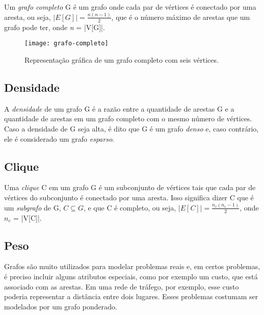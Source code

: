 Um \emph{grafo completo} G é um grafo onde cada par de vértices é conectado por uma aresta, ou seja, $|E[G]| = \frac{n(n-1)}{2}$, que é o número máximo de arestas que um grafo pode ter, onde \emph{n} = |V[G]|.

\begin{figure}[H]
\texttt{[image: grafo-completo]}
\centering
\caption{Representação gráfica de um grafo completo com seis vértices.}
\end{figure}

\subsection{Densidade}
\label{conceitos__grafo--densidade}

A \emph{densidade} de um grafo G é a razão entre a quantidade de arestas G e a quantidade de arestas em um grafo completo com o mesmo número de vértices. Caso a densidade de G seja alta, é dito que G é um grafo \emph{denso} e, caso contrário, ele é considerado um grafo \emph{esparso}.

\subsection{Clique}
\label{conceitos__grafo--clique}

Uma \emph{clique} C em um grafo G é um subconjunto de vértices tais que cada par de vértices do subconjunto é conectado por uma aresta. Isso significa dizer C que é um \emph{subgrafo} de G, $C \subseteq G$, e que C é completo, ou seja, $|E[C]| = \frac{n_{c}(n_{c}-1)}{2}$, onde $n_{c}$ = |V[C]|.


\subsection{Peso}
\label{conceitos__grafo--peso}

Grafos são muito utilizados para modelar problemas reais e, em certos problemas, é preciso incluir alguns atributos especiais, como por exemplo um custo, que está associado com as arestas. Em uma rede de tráfego, por exemplo, esse custo poderia representar a distância entre dois lugares. Esses problemas costumam ser modelados por um grafo ponderado.

